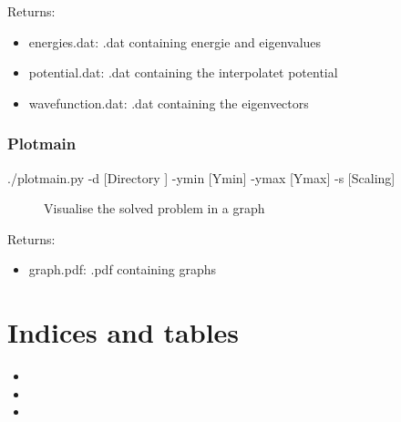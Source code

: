 \documentclass[letterpaper,10pt,english]{sphinxmanual}
\begin{document}
Returns:
\begin{itemize}
\item {} 
energies.dat: .dat containing energie and eigenvalues

\item {} 
potential.dat:        .dat containing the interpolatet potential

\item {} 
wavefunction.dat:     .dat containing the eigenvectors

\end{itemize}


\subsection{Plotmain}
\label{\detokenize{README:plotmain}}\begin{description}
\item[{./plotmain.py -d {[}Directory {]} -ymin {[}Ymin{]} -ymax {[}Ymax{]} -s {[}Scaling{]}}] \leavevmode
Visualise the solved problem in a graph

\end{description}

Returns:
\begin{itemize}
\item {} 
graph.pdf:            .pdf containing graphs

\end{itemize}


\chapter{Indices and tables}
\label{\detokenize{index:indices-and-tables}}\begin{itemize}
\item {} 

\item {} 

\item {} 

\end{itemize}



\renewcommand{\indexname}{Index}
\printindex
\end{document}
